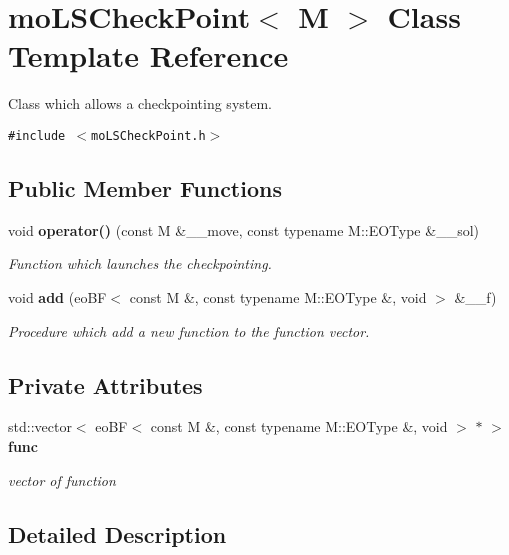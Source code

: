 \section{mo\-LSCheck\-Point$<$ M $>$ Class Template Reference}
\label{classmo_l_s_check_point}
Class which allows a checkpointing system.  


{\tt \#include $<$mo\-LSCheck\-Point.h$>$}

\subsection*{Public Member Functions}
\begin{CompactItemize}
\item 
void {\bf operator()} (const M \&\_\-\_\-move, const typename M::EOType \&\_\-\_\-sol)
\begin{CompactList}\small\item\em Function which launches the checkpointing. \item\end{CompactList}\item 
void {\bf add} (eo\-BF$<$ const M \&, const typename M::EOType \&, void $>$ \&\_\-\_\-f)
\begin{CompactList}\small\item\em Procedure which add a new function to the function vector. \item\end{CompactList}\end{CompactItemize}
\subsection*{Private Attributes}
\begin{CompactItemize}
\item 
std::vector$<$ eo\-BF$<$ const M \&, const typename M::EOType \&, void $>$ $\ast$ $>$ {\bf func}\label{classmo_l_s_check_point_ff2a31ee5689a804bd9a572c51a36ca4}

\begin{CompactList}\small\item\em vector of function \item\end{CompactList}\end{CompactItemize}


\subsection{Detailed Description}
